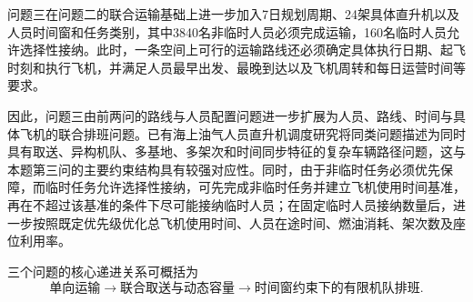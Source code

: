 问题三在问题二的联合运输基础上进一步加入7日规划周期、24架具体直升机以及人员时间窗和任务类别，其中3840名非临时人员必须完成运输，160名临时人员允许选择性接纳。此时，一条空间上可行的运输路线还必须确定具体执行日期、起飞时刻和执行飞机，并满足人员最早出发、最晚到达以及飞机周转和每日运营时间等要求。

因此，问题三由前两问的路线与人员配置问题进一步扩展为人员、路线、时间与具体飞机的联合排班问题。已有海上油气人员直升机调度研究将同类问题描述为同时具有取送、异构机队、多基地、多架次和时间同步特征的复杂车辆路径问题\cite{nafstad2021}，这与本题第三问的主要约束结构具有较强对应性。同时，由于非临时任务必须优先保障，而临时任务允许选择性接纳，可先完成非临时任务并建立飞机使用时间基准，再在不超过该基准的条件下尽可能接纳临时人员；在固定临时人员接纳数量后，进一步按照既定优先级优化总飞机使用时间、人员在途时间、燃油消耗、架次数及座位利用率。

三个问题的核心递进关系可概括为
\[
\boxed{
\text{单向运输}
\rightarrow
\text{联合取送与动态容量}
\rightarrow
\text{时间窗约束下的有限机队排班}
}.
\]
